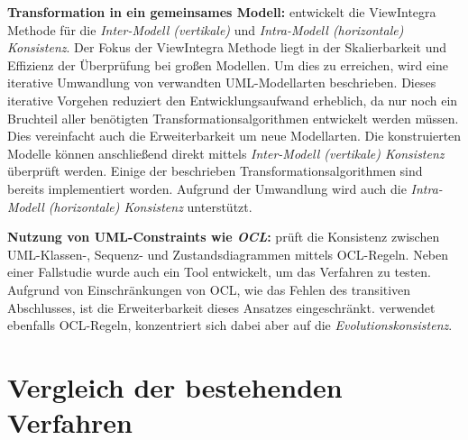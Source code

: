 \textbf{Transformation in ein gemeinsames Modell:}
\cite{Egyed2001} entwickelt die ViewIntegra Methode für die  \emph{Inter-Modell (vertikale)} und \emph{Intra-Modell (horizontale) Konsistenz}.
Der Fokus der ViewIntegra Methode liegt in der Skalierbarkeit und Effizienz der Überprüfung bei großen Modellen.
Um dies zu erreichen, wird eine iterative Umwandlung von verwandten UML-Modellarten beschrieben.
Dieses iterative Vorgehen reduziert den Entwicklungsaufwand erheblich, da nur noch ein Bruchteil aller benötigten Transformationsalgorithmen entwickelt werden müssen.
Dies vereinfacht auch die Erweiterbarkeit um neue Modellarten.
Die konstruierten Modelle können anschließend direkt mittels \emph{Inter-Modell (vertikale) Konsistenz} überprüft werden.
Einige der beschrieben Transformationsalgorithmen sind bereits implementiert worden.
Aufgrund der Umwandlung wird auch die \emph{Intra-Modell (horizontale) Konsistenz} unterstützt.

\textbf{Nutzung von UML-Constraints wie \emph{OCL}:}
\cite{Egyed2006} prüft die Konsistenz zwischen UML-Klassen-, Sequenz- und Zustandsdiagrammen mittels OCL-Regeln.
Neben einer Fallstudie wurde auch ein Tool entwickelt, um das Verfahren zu testen.
Aufgrund von Einschränkungen von OCL, wie das Fehlen des transitiven Abschlusses, ist die Erweiterbarkeit dieses Ansatzes eingeschränkt.
\cite{Briand2003} verwendet ebenfalls OCL-Regeln, konzentriert sich dabei aber auf die \emph{Evolutionskonsistenz}.

\section{Vergleich der bestehenden Verfahren}

